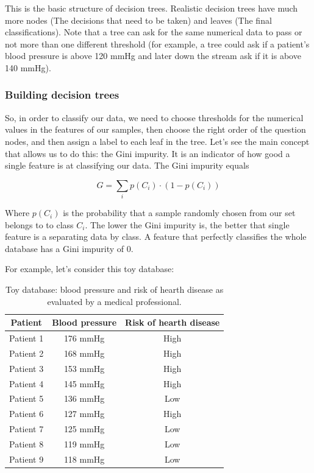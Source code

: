 \documentclass[a4paper]{report}
\begin{document}
This is the basic structure of decision trees.
Realistic decision trees have much more nodes (The decisions that need to be taken) and leaves (The final classifications).
Note that a tree can ask for the same numerical data to pass or not more than one different threshold (for example, a tree could ask if a patient's blood pressure is above 120 mmHg and later down the stream ask if it is above 140 mmHg).

\subsubsection{Building decision trees}

So, in order to classify our data, we need to choose thresholds for the numerical values in the features of our samples, then choose the right order of the question nodes, and then assign a label to each leaf in the tree.
Let's see the main concept that allows us to do this:
the Gini impurity.
It is an indicator of how good a single feature is at classifying our data.
The Gini impurity equals

\begin{equation}
	G = \sum_i p(C_i) \cdot (1 - p(C_i))
\end{equation}

Where $p(C_i)$ is the probability that a sample randomly chosen from our set belongs to to class $C_i$.
The lower the Gini impurity is, the better that single feature is a separating data by class.
A feature that perfectly classifies the whole database has a Gini impurity of 0.

For example, let's consider this toy database:

\begin{table}[H]
	\begin{center}
		\begin{tabular}{c|c|c} %
			\textbf{Patient} & \textbf{Blood pressure} & \textbf{Risk of hearth disease}\\
			\hline
			Patient 1 &  176 mmHg & High\\
			Patient 2 &  168 mmHg & High\\
			Patient 3 &  153 mmHg & High\\
			Patient 4 &  145 mmHg & High\\
			Patient 5 &  136 mmHg & Low\\
			Patient 6 &  127 mmHg & High\\
			Patient 7 &  125 mmHg & Low\\
			Patient 8 &  119 mmHg & Low\\
			Patient 9 &  118 mmHg & Low\\
		\end{tabular}
		\caption{Toy database: blood pressure and risk of hearth disease as evaluated by a medical professional.}
		\label{tree_table}
	\end{center}
\end{table}
\end{document}
